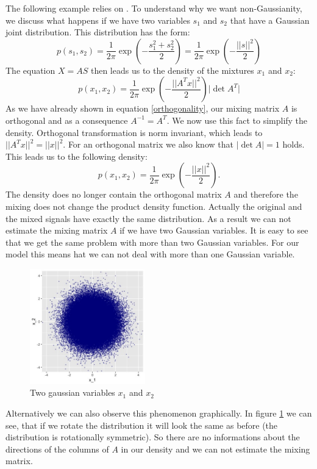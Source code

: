 \documentclass[12pt, a4paper]{article}
\numberwithin{equation}{section}
\numberwithin{figure}{section}
\numberwithin{table}{section}
\begin{document}
	The following example relies on \citet{ICA_Book}.
	To understand why we want non-Gaussianity, we discuss what happens if we have two variables \mbox{$s_1$} and \mbox{$s_2$} that have a Gaussian joint distribution.
	This distribution has the form:
	\begin{equation}
	p(s_1,s_2)=\frac{1}{2\pi} \exp \left(-\frac{s_1^2+s_2^2}{2}\right)=\frac{1}{2\pi}\exp \left(-\frac{\vert \vert s \vert \vert ^2}{2}\right)
	\end{equation}
	The equation \mbox{$X=AS$} then leads us to the density of the mixtures \mbox{$x_1$} and \mbox{$x_2$}:
	\begin{equation}
	p(x_1,x_2)=\frac{1}{2\pi}\exp \left(-\frac{\vert \vert A^T x \vert \vert ^2}{2}\right)\vert \det A^T \vert 
	\end{equation}
	As we have already shown in equation \ref{orthogonality}, our mixing matrix $A$ is orthogonal and as a consequence \mbox{$A^{-1}=A^T$}.
	We now use this fact to simplify the density.
	Orthogonal transformation is norm invariant, which leads to \mbox{$\vert \vert A^T x \vert \vert ^2 = \vert \vert x\vert \vert ^2$}.
	For an orthogonal matrix we also know that \mbox{$\vert \det A \vert = 1 $} holds.
	This leads us to the following density:
	\begin{equation}
	p(x_1,x_2)=\frac{1}{2\pi}\exp \left(-\frac{\vert \vert x \vert \vert ^2}{2}\right).
	\end{equation}
	The density does no longer contain the orthogonal matrix $A$ and therefore the mixing does not change the product density function.
	Actually the original and the mixed signals have exactly the same distribution.
	As a result we can not estimate the mixing matrix $A$ if we have two Gaussian variables.
	It is easy to see that we get the same problem with more than two Gaussian variables.
	For our model this means hat we can not deal with more than one Gaussian variable.
	
	\begin{figure}[hbt]
		\begin{centering}
			\includegraphics[width=5cm]{gauss-plot.jpeg}
			\caption{Two gaussian variables $x_1$ and $x_2$}
			\label{gauss-plot}
		\end{centering}
	\end{figure}
	Alternatively we can also observe this phenomenon graphically.
	In figure \ref{gauss-plot}
	we can see, that if we rotate the distribution it will look the same as before (the distribution is rotationally symmetric).
	So there are no informations about the directions of the columns of $A$ in our density and we can not estimate the mixing matrix.
	
\end{document}
